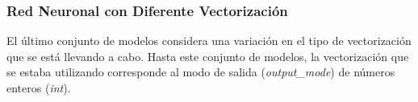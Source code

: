 \subsubsection{Red Neuronal con Diferente Vectorización}
El último conjunto de modelos considera una variación en el tipo de vectorización que se está llevando a cabo. Hasta este conjunto de modelos, la vectorización que se estaba utilizando corresponde al modo de salida (\textit{output\_mode}) de números enteros (\textit{int}). 
